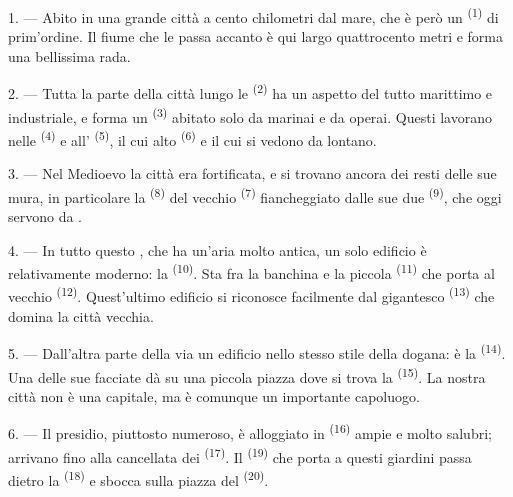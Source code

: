 \VUsaut{3.0mm}

1. --- Abito in una grande città a cento chilometri dal mare, che è però un
 \textsuperscript{(1)} di prim'ordine. Il fiume che le passa accanto è
qui largo quattrocento metri e forma una bellissima rada.

2. --- Tutta la parte della città lungo le  \textsuperscript{(2)} ha
un aspetto del tutto marittimo e industriale, e forma un 
\textsuperscript{(3)} abitato solo da marinai e da operai. Questi lavorano nelle
 \textsuperscript{(4)} e all'
\textsuperscript{(5)}, il cui alto  \textsuperscript{(6)} e il cui
 si vedono da lontano.

3. --- Nel Medioevo la città era fortificata, e si trovano ancora dei resti delle sue
mura, in particolare la  \textsuperscript{(8)} del vecchio
 \textsuperscript{(7)} fiancheggiato dalle sue due 
\textsuperscript{(9)}, che oggi servono da .

4. --- In tutto questo , che ha un'aria molto antica, un solo
edificio è relativamente moderno: la  \textsuperscript{(10)}. Sta fra la
banchina e la piccola  \textsuperscript{(11)} che porta al vecchio
 \textsuperscript{(12)}. Quest'ultimo edificio si riconosce facilmente
dal gigantesco  \textsuperscript{(13)} che domina la città vecchia.

5. --- Dall'altra parte della via  un edificio nello stesso stile della
dogana: è la  \textsuperscript{(14)}. Una delle sue facciate dà su una
piccola piazza dove si trova la  \textsuperscript{(15)}. La nostra
città non è una capitale, ma è comunque un importante capoluogo.

\VUsaut{5.0mm}
\VUsaut{3.4mm}

6. --- Il presidio, piuttosto numeroso, è alloggiato in 
\textsuperscript{(16)} ampie e molto salubri; arrivano fino alla cancellata dei
 \textsuperscript{(17)}. Il 
\textsuperscript{(19)} che porta a questi giardini passa dietro la
 \textsuperscript{(18)} e sbocca sulla piazza del
 \textsuperscript{(20)}.

